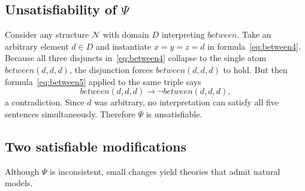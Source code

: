 \documentclass[12pt]{article}
\begin{document}
\subsection*{Unsatisfiability of $\Psi$}

Consider any structure $\mathcal{N}$ with domain $D$ interpreting $\mathit{between}$.  Take an arbitrary element $d\in D$ and instantiate $x=y=z=d$ in formula~\eqref{eq:between4}.  Because all three disjuncts in~\eqref{eq:between4} collapse to the single atom $\mathit{between}(d,d,d)$, the disjunction forces $\mathit{between}(d,d,d)$ to hold.  But then formula~\eqref{eq:between5} applied to the same triple says
\[
\mathit{between}(d,d,d) \to \neg\mathit{between}(d,d,d),
\]
a contradiction.  Since $d$ was arbitrary, no interpretation can satisfy all five sentences simultaneously.  Therefore $\Psi$ is unsatisfiable.

\subsection*{Two satisfiable modifications}

Although $\Psi$ is inconsistent, small changes yield theories that admit natural models.
\end{document}
